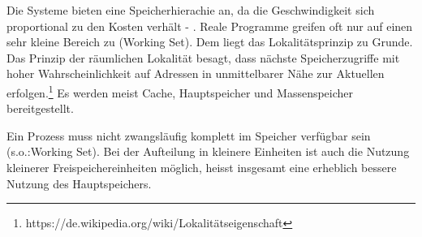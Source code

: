 \begin{answer}
  Die Systeme bieten eine Speicherhierachie an, da die Geschwindigkeit sich proportional zu den
  Kosten verhält - . Reale Programme greifen oft nur auf einen sehr kleine Bereich zu (Working Set).
  Dem liegt das Lokalitätsprinzip zu Grunde.
  Das Prinzip der räumlichen Lokalität besagt, dass nächste Speicherzugriffe mit hoher Wahrscheinlichkeit auf Adressen in unmittelbarer Nähe zur Aktuellen erfolgen.\footnote{https://de.wikipedia.org/wiki/Lokalitätseigenschaft}
  Es werden meist Cache, Hauptspeicher und Massenspeicher bereitgestellt.
\end{answer}

\begin{answer}
  Ein Prozess muss nicht zwangsläufig komplett im Speicher verfügbar sein (s.o.:Working
  Set). Bei der Aufteilung in kleinere Einheiten ist auch die Nutzung kleinerer Freispeichereinheiten möglich, heisst insgesamt eine erheblich bessere Nutzung des Hauptspeichers.
\end{answer}


